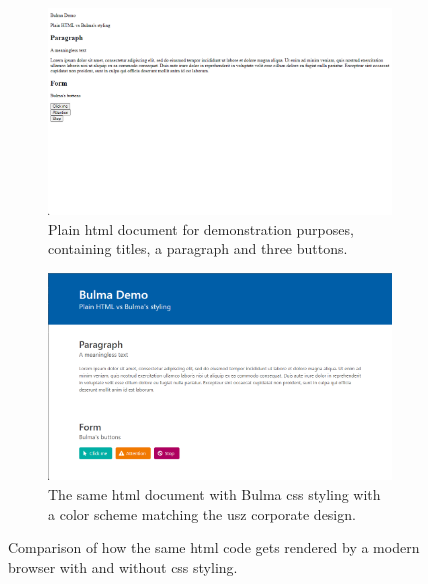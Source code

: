 \documentclass[\relativeRoot/main.tex]{subfiles}
\begin{document}
\begin{figure}
    \begin{subfigure}[b]{0.48\textwidth}
        \includegraphics[width=\textwidth, frame]{figures/demo_without_bulma.png}
        \caption[
            Plain demo HTML document
        ]{
            Plain \acrshort{html} document for demonstration purposes, containing titles, a paragraph and three buttons.
        }
        \label{fig:lyprox:plain}
    \end{subfigure}
    \hfill
    \begin{subfigure}[b]{0.48\textwidth}
        \includegraphics[width=\textwidth, frame]{figures/demo_with_bulma.png}
        \caption[
            HTML demo document with Bulma styling
        ]{
            The same \acrshort{html} document with Bulma \acrshort{css} styling with a color scheme matching the \gls{usz} corporate design.
        }
        \label{fig:lyprox:bulma}
    \end{subfigure}
    \caption[Plain HTML vs HTML plus CSS styling]{
        Comparison of how the same \acrshort{html} code gets rendered by a modern browser with and without \acrshort{css} styling.
    }
    \label{fig:lyprox:plain_vs_bulma}
\end{figure}
\end{document}
